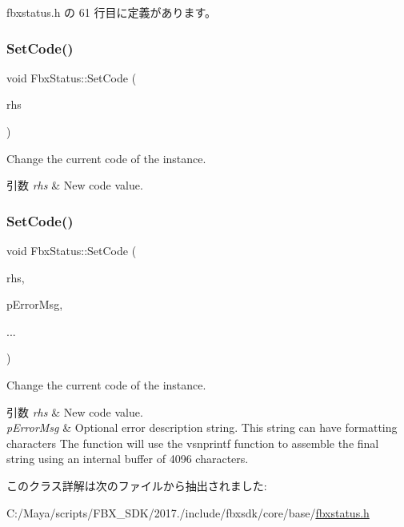  fbxstatus.\+h の 61 行目に定義があります。

\mbox{\label{class_fbx_status_a906fe62e4753eb13571c359daf07cbf3}} 
\subsubsection{\texorpdfstring{Set\+Code()}{SetCode()}\hspace{0.1cm}{\footnotesize\ttfamily [1/2]}}
{\footnotesize\ttfamily void Fbx\+Status\+::\+Set\+Code (\begin{DoxyParamCaption}\item[{const \hyperlink{class_fbx_status_a6a631d5d95b28e31a19aabd5f5809ecc}{E\+Status\+Code}}]{rhs }\end{DoxyParamCaption})}

Change the current code of the instance. 
\begin{DoxyParams}{引数}
{\em rhs} & New code value. \\
\hline
\end{DoxyParams}
\mbox{\label{class_fbx_status_a6991ae689fa0c9f5f72449f531772deb}} 
\subsubsection{\texorpdfstring{Set\+Code()}{SetCode()}\hspace{0.1cm}{\footnotesize\ttfamily [2/2]}}
{\footnotesize\ttfamily void Fbx\+Status\+::\+Set\+Code (\begin{DoxyParamCaption}\item[{const \hyperlink{class_fbx_status_a6a631d5d95b28e31a19aabd5f5809ecc}{E\+Status\+Code}}]{rhs,  }\item[{const char $\ast$}]{p\+Error\+Msg,  }\item[{}]{... }\end{DoxyParamCaption})}

Change the current code of the instance. 
\begin{DoxyParams}{引数}
{\em rhs} & New code value. \\
\hline
{\em p\+Error\+Msg} & Optional error description string. This string can have formatting characters The function will use the vsnprintf function to assemble the final string using an internal buffer of 4096 characters. \\
\hline
\end{DoxyParams}


このクラス詳解は次のファイルから抽出されました\+:\begin{DoxyCompactItemize}
\item 
C\+:/\+Maya/scripts/\+F\+B\+X\+\_\+\+S\+D\+K/2017./include/fbxsdk/core/base/\hyperlink{fbxstatus_8h}{fbxstatus.\+h}\end{DoxyCompactItemize}

